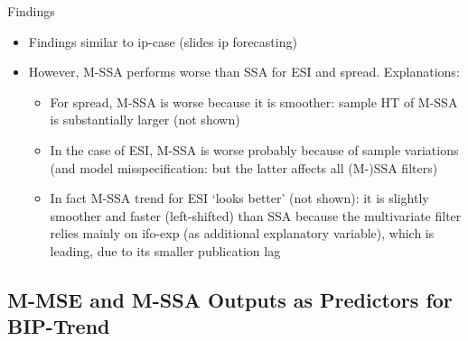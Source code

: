 \documentclass{beamer}
\begin{document}
\begin{frame} {Findings}
\begin{itemize}
\item Findings similar to ip-case (slides ip forecasting) 
\item However, M-SSA performs worse than SSA for ESI and spread. Explanations:
\begin{itemize}
\item For spread, M-SSA is worse because it is smoother: sample HT of M-SSA is substantially larger (not shown)
\item In the case of ESI, M-SSA is worse probably because of sample variations (and model misspecification: but the latter affects all (M-)SSA filters) 
\item In fact M-SSA trend for ESI `looks better' (not shown): it is slightly smoother and faster (left-shifted) than SSA because the multivariate filter relies mainly on ifo-exp (as additional explanatory variable), which is leading, due to its smaller publication lag
\end{itemize}
\end{itemize}





\end{frame}



\subsection{M-MSE and M-SSA Outputs as Predictors for BIP-Trend}
\end{document}
